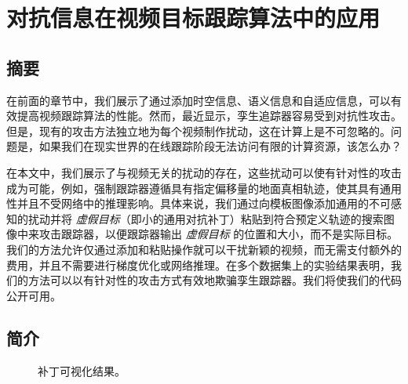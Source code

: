 \chapter{对抗信息在视频目标跟踪算法中的应用} \label{chap:attack}

\section{摘要}
在前面的章节中，我们展示了通过添加时空信息、语义信息和自适应信息，可以有效提高视频跟踪算法的性能。然而，最近显示，孪生追踪器容易受到对抗性攻击。但是，现有的攻击方法独立地为每个视频制作扰动，这在计算上是不可忽略的。问题是，如果我们在现实世界的在线跟踪阶段无法访问有限的计算资源，该怎么办？

在本文中，我们展示了与视频无关的扰动的存在，这些扰动可以使有针对性的攻击成为可能，例如，强制跟踪器遵循具有指定偏移量的地面真相轨迹，使其具有通用性并且不受网络中的推理影响。具体来说，我们通过向模板图像添加通用的不可感知的扰动并将 \textit{虚假目标}（即小的通用对抗补丁）粘贴到符合预定义轨迹的搜索图像中来攻击跟踪器，以便跟踪器输出 \textit{虚假目标} 的位置和大小，而不是实际目标。我们的方法允许仅通过添加和粘贴操作就可以干扰新颖的视频，而无需支付额外的费用，并且不需要进行梯度优化或网络推理。在多个数据集上的实验结果表明，我们的方法可以以有针对性的攻击方式有效地欺骗孪生跟踪器。我们将使我们的代码公开可用。

\section{简介}

\begin{figure}[t]
\centering
{} \qquad 
{}
\caption{补丁可视化结果。}
\end{figure}

